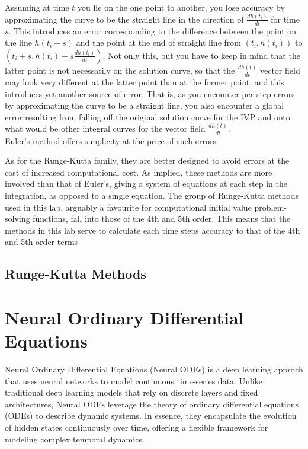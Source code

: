 \documentclass[11pt]{article}
\begin{document}
    Assuming at time $t$ you lie on the one point to another, you lose accuracy by approximating the curve to be the straight line in the direction of $\frac{dh(t_i)}{dt}$ for time $s$.
    This introduces an error corresponding to the difference between the point on the line $h(t_i+s)$ and the point at the end of straight line from $(t_i, h(t_i))$ to $(t_i + s, h(t_i) + s\frac{dh(t_i)}{dt})$.
    Not only this, but you have to keep in mind that the latter point is not necessarily on the solution curve, so that the $\frac{dh(t)}{dt}$ vector field may look very different at the latter point than at the former point, and this introduces yet another source of error.
    That is, as you encounter per-step errors by approximating the curve to be a straight line, you also encounter a global error resulting from falling off the original solution curve for the IVP and onto what would be other integral curves for the vector field $\frac{dh(t)}{dt}$.\\
    Euler's method offers simplicity at the price of such errors.

    As for the Runge-Kutta family, they are better designed to avoid errors at the cost of increased computational cost.
    As implied, these methods are more involved than that of Euler's, giving a system of equations at each step in the integration, as opposed to a single equation.
    The group of Runge-Kutta methods used in this lab, arguably a favourite for computational initial value problem-solving functions, fall into those of the 4th and 5th order.
    This means that the methods in this lab serve to calculate each time steps accuracy to that of the 4th and 5th order terms


\subsection{Runge-Kutta Methods}

\section{Neural Ordinary Differential Equations}

Neural Ordinary Differential Equations (Neural ODEs) is a deep learning approch that uses neural networks to model continuous time-series data. Unlike traditional deep learning models that rely on discrete layers and fixed architectures, Neural ODEs leverage the theory of ordinary differential equations (ODEs) to describe dynamic systems. In essence, they encapsulate the evolution of hidden states continuously over time, offering a flexible framework for modeling complex temporal dynamics.
\end{document}
